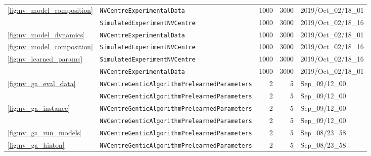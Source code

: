 \begin{tabular}{llrrl}
\cline{1-5}
\multirow{2}{*}{\cref{fig:nv_model_composition}} & \texttt{NVCentreExperimentalData} &                                     1000 &                                     3000 &                      2019/Oct\_02/18\_01 \\
                        & \texttt{SimulatedExperimentNVCentre} &                                     1000 &                                     3000 &                      2019/Oct\_02/18\_16 \\
\cline{1-5}
\cref{fig:nv_model_dynamics} & \texttt{NVCentreExperimentalData} &                                     1000 &                                     3000 &                      2019/Oct\_02/18\_01 \\
\cref{fig:nv_model_composition} & \texttt{SimulatedExperimentNVCentre} &                                     1000 &                                     3000 &                      2019/Oct\_02/18\_16 \\
\multirow{2}{*}{\cref{fig:nv_learned_params}} & \texttt{SimulatedExperimentNVCentre} &                                     1000 &                                     3000 &                      2019/Oct\_02/18\_16 \\
                        & \texttt{NVCentreExperimentalData} &                                     1000 &                                     3000 &                      2019/Oct\_02/18\_01 \\
\cline{1-5}
\multirow{2}{*}{\cref{fig:nv_ga_eval_data}} & \texttt{NVCentreGenticAlgorithmPrelearnedParameters} &                                        2 &                                        5 &                           Sep\_09/12\_00 \\
                        & \texttt{NVCentreGenticAlgorithmPrelearnedParameters} &                                        2 &                                        5 &                           Sep\_09/12\_00 \\
\cline{1-5}
\multirow{2}{*}{\cref{fig:nv_ga_instance}} & \texttt{NVCentreGenticAlgorithmPrelearnedParameters} &                                        2 &                                        5 &                           Sep\_09/12\_00 \\
                        & \texttt{NVCentreGenticAlgorithmPrelearnedParameters} &                                        2 &                                        5 &                           Sep\_09/12\_00 \\
\cline{1-5}
\cref{fig:nv_ga_run_models} & \texttt{NVCentreGenticAlgorithmPrelearnedParameters} &                                        2 &                                        5 &                           Sep\_08/23\_58 \\
\cref{fig:nv_ga_hinton} & \texttt{NVCentreGenticAlgorithmPrelearnedParameters} &                                        2 &                                        5 &                           Sep\_08/23\_58 \\
\hline
\end{tabular}
